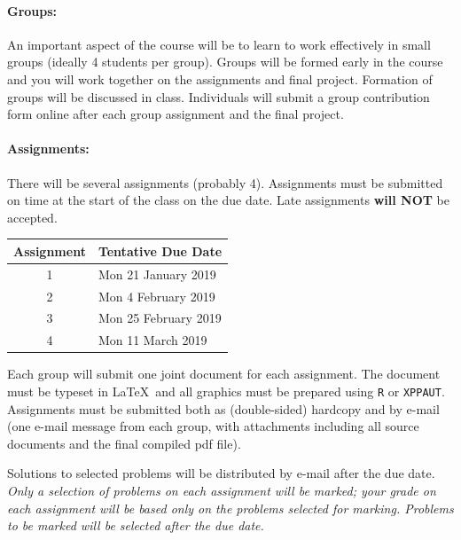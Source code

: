 \documentclass[12pt]{article}
\newcommand{\note}{\noindent{\bfseries\slshape Note:\/} }
\begin{document}
\paragraph*{Groups:} An important aspect of the course will be to learn to work effectively in small groups (ideally 4 students per group).  Groups will be formed early in the course and you will work together on the assignments and final project.  Formation of groups will be discussed in class.  Individuals will submit a group contribution form online after each group assignment and the final project.

\paragraph*{Assignments:} There will be several assignments (probably 4).  Assignments must be submitted on time at the start of the class on the due date.  Late assignments {\bf will NOT} be accepted.
%
\begin{center}
\begin{tabular}{c|l}
\bf Assignment & \bf Tentative Due Date \\\hline
1 & Mon 21 January 2019 \\
2 & Mon 4 February 2019 \\
3 & Mon 25 February 2019 \\
4 & Mon 11 March 2019 \\
\end{tabular}
\end{center}
%
\noindent
Each group will submit one joint document for each assignment.  The document must be typeset in \LaTeX\ and all graphics must be prepared using {\tt R} or {\tt XPPAUT}.  Assignments must be submitted both as (double-sided) hardcopy and by e-mail (one e-mail message from each group, with attachments including all source documents and the final compiled pdf file).

Solutions to selected problems will be distributed by e-mail after the due date.
\note \emph{Only a selection of problems on each assignment will be marked; your grade on each assignment will be based only on the problems selected for marking.  Problems to be marked will be selected after the due date.}

\end{document}
